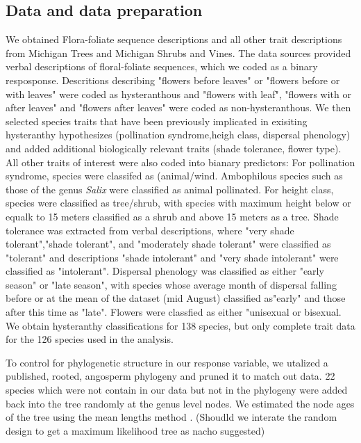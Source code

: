 \documentclass{article}\usepackage[]{graphicx}\usepackage[]{color}
\begin{document}
\subsection{Data and data preparation}
We obtained Flora-foliate sequence descriptions and all other trait descriptions from Michigan Trees and Michigan Shrubs and Vines.  The data sources provided verbal descriptions of floral-foliate sequences, which we coded as a binary resposponse. Descritions describing "flowers before leaves" or "flowers before or with leaves" were coded as hysteranthous and "flowers with leaf", "flowers with or after leaves" and "flowers after leaves" were coded as non-hysteranthous. We then selected species traits that have been previously implicated in exisiting hysteranthy hypothesizes (pollination syndrome,heigh class, dispersal phenology) and added additional biologically relevant traits (shade tolerance, flower type). All other traits of interest were also coded into bianary predictors: For pollination syndrome, species were classifed as (animal/wind. Ambophilous species such as those of the genus \textit{Salix} were classified as animal pollinated. For height class, species were classified as tree/shrub, with species with maximum height below or equalk to 15 meters classified as a shrub and above 15 meters as a tree. Shade tolerance was extracted from verbal descriptions, where "very shade tolerant","shade tolerant", and "moderately shade tolerant" were classified as "tolerant" and descriptions "shade intolerant" and "very shade intolerant" were classified as "intolerant". Dispersal phenology was classified as either "early season" or "late season", with species whose average month of dispersal falling before or at the mean of the dataset (mid August) classified as"early" and those after this time as "late". Flowers were classfied as either "unisexual or bisexual. We obtain hysteranthy classifications for 138 species, but only complete trait data for the 126 species used in the analysis. 
\par
To control for phylogenetic structure in our response variable, we utalized a published, rooted, angosperm phylogeny \citep{Zanne et al} and pruned it to match out data. 22 species which were not contain in our data but not in the phylogeny were added back into the tree randomly at the genus level nodes. We estimated the node ages of the tree using the mean lengths method \citep{Britton2002}. (Shoudld we interate the random design to get a maximum likelihood tree as nacho suggested)
\end{document}
